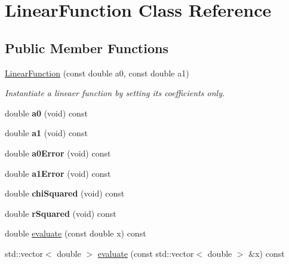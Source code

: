 \hypertarget{class_linear_function}{}\section{Linear\+Function Class Reference}
\label{class_linear_function}
\subsection*{Public Member Functions}
\begin{DoxyCompactItemize}
\item 
\hyperlink{class_linear_function_ad68f82a23780368e83ceb96ec653aac1}{Linear\+Function} (const double a0, const double a1)
\begin{DoxyCompactList}\small\item\em Instantiate a lineaer function by setting its coefficients only. \end{DoxyCompactList}\item 
\hypertarget{class_linear_function_a0baae434a061ea70eaea3b58ef969653}{}\label{class_linear_function_a0baae434a061ea70eaea3b58ef969653} 
double {\bfseries a0} (void) const
\item 
\hypertarget{class_linear_function_a7984cea380d51b44dbf521b3ef02bc63}{}\label{class_linear_function_a7984cea380d51b44dbf521b3ef02bc63} 
double {\bfseries a1} (void) const
\item 
\hypertarget{class_linear_function_a597e28db6653885caf0b82b7fb19591c}{}\label{class_linear_function_a597e28db6653885caf0b82b7fb19591c} 
double {\bfseries a0\+Error} (void) const
\item 
\hypertarget{class_linear_function_a50ba10d28fb31099fc55a89ba28653e1}{}\label{class_linear_function_a50ba10d28fb31099fc55a89ba28653e1} 
double {\bfseries a1\+Error} (void) const
\item 
\hypertarget{class_linear_function_a7504fb0d6af0b66950c5b31a64a83145}{}\label{class_linear_function_a7504fb0d6af0b66950c5b31a64a83145} 
double {\bfseries chi\+Squared} (void) const
\item 
\hypertarget{class_linear_function_aeaa836943949b1a923a28ffe75f7f2f3}{}\label{class_linear_function_aeaa836943949b1a923a28ffe75f7f2f3} 
double {\bfseries r\+Squared} (void) const
\item 
double \hyperlink{class_linear_function_a8913bf6feb840991af9b324c6d46e2eb}{evaluate} (const double x) const
\item 
std\+::vector$<$ double $>$ \hyperlink{class_linear_function_a8c0653b32046a1c0b6b41b1d01128bec}{evaluate} (const std\+::vector$<$ double $>$ \&x) const
\end{DoxyCompactItemize}
